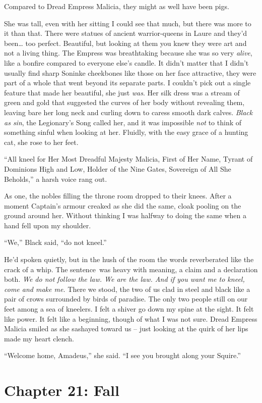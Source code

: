 \documentclass[12pt, openany]{book}
\begin{document}
Compared to Dread Empress Malicia, they might as well have been pigs.

She was tall, even with her sitting I could see that much, but there was more to it than that. There were statues of ancient warrior-queens in Laure and they’d been… too perfect. Beautiful, but looking at them you knew they were art and not a living thing. The Empress was breathtaking because she was so very \textit{alive}, like a bonfire compared to everyone else’s candle. It didn’t matter that I didn’t usually find sharp Soninke cheekbones like those on her face attractive, they were part of a whole that went beyond its separate parts. I couldn’t pick out a single feature that made her beautiful, she just \textit{was}. Her silk dress was a stream of green and gold that suggested the curves of her body without revealing them, leaving bare her long neck and curling down to caress smooth dark calves. \textit{Black as sin}, the Legionary’s Song called her, and it was impossible \textit{not }to think of something sinful when looking at her. Fluidly, with the easy grace of a hunting cat, she rose to her feet.

“All kneel for Her Most Dreadful Majesty Malicia, First of Her Name, Tyrant of Dominions High and Low, Holder of the Nine Gates, Sovereign of All She Beholds,” a harsh voice rang out.

As one, the nobles filling the throne room dropped to their knees. After a moment Captain’s armour creaked as she did the same, cloak pooling on the ground around her. Without thinking I was halfway to doing the same when a hand fell upon my shoulder.

“We,” Black said, “do not kneel.”

He’d spoken quietly, but in the hush of the room the words reverberated like the crack of a whip. The sentence was heavy with meaning, a claim and a declaration both. \textit{We do not follow the law. We are the law. And if you want me to kneel, come and make me.} There we stood, the two of us clad in steel and black like a pair of crows surrounded by birds of paradise. The only two people still on our feet among a sea of kneelers. I felt a shiver go down my spine at the sight. It felt like power. It felt like a beginning, though of what I was not sure. Dread Empress Malicia smiled as she sashayed toward us – just looking at the quirk of her lips made my heart clench.

“Welcome home, Amadeus,” she said. “I see you brought along your Squire.”
\clearpage
\chapter{Chapter 21: Fall}
\end{document}
